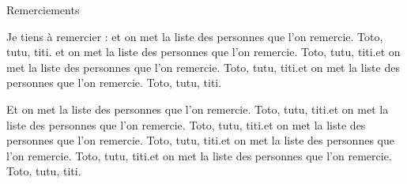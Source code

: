 Remerciements

Je tiens à remercier :
et on met la liste des personnes que l'on remercie. Toto, tutu, titi. et on met la liste des personnes que l'on remercie. Toto, tutu, titi.et on met la liste des personnes que l'on remercie. Toto, tutu, titi.et on met la liste des personnes que l'on remercie. Toto, tutu, titi.


Et on met la liste des personnes que l'on remercie. Toto, tutu, titi.et on met la liste des personnes que l'on remercie. Toto, tutu, titi.et on met la liste des personnes que l'on remercie. Toto, tutu, titi.et on met la liste des personnes que l'on remercie. Toto, tutu, titi.et on met la liste des personnes que l'on remercie. Toto, tutu, titi.

